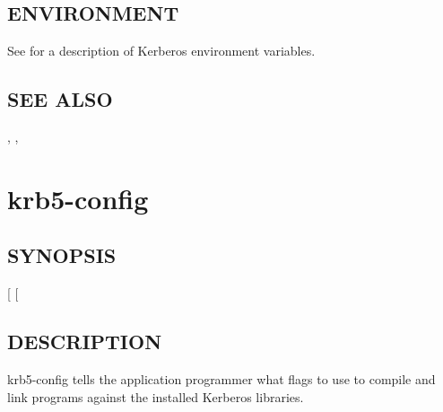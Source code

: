 \documentclass[letterpaper,10pt,english]{sphinxmanual}
\begin{document}
\subsection{ENVIRONMENT}
\label{\detokenize{user/user_commands/kpasswd:environment}}
See {\hyperref[\detokenize{user/user_config/kerberos:kerberos-7}]{}} for a description of Kerberos environment
variables.


\subsection{SEE ALSO}
\label{\detokenize{user/user_commands/kpasswd:see-also}}
, , {\hyperref[\detokenize{user/user_config/kerberos:kerberos-7}]{}}


\section{krb5-config}
\label{\detokenize{user/user_commands/krb5-config:krb5-config-1}}\label{\detokenize{user/user_commands/krb5-config:krb5-config}}\label{\detokenize{user/user_commands/krb5-config::doc}}

\subsection{SYNOPSIS}
\label{\detokenize{user/user_commands/krb5-config:synopsis}}
{[}\sphinxstylestrong{-} \textbar{} \sphinxstylestrong{-} \textbar{} \sphinxstylestrong{-} \textbar{} \sphinxstylestrong{-} \textbar{} \sphinxstylestrong{-} \textbar{} \sphinxstylestrong{-} \textbar{} \sphinxstylestrong{-} \textbar{} \sphinxstylestrong{-} \textbar{} \sphinxstylestrong{-} \textbar{} \sphinxstylestrong{-} \textbar{} \sphinxstylestrong{-} {[}\sphinxstyleemphasis{libraries}{]}{]}


\subsection{DESCRIPTION}
\label{\detokenize{user/user_commands/krb5-config:description}}
krb5-config tells the application programmer what flags to use to compile
and link programs against the installed Kerberos libraries.
\end{document}
